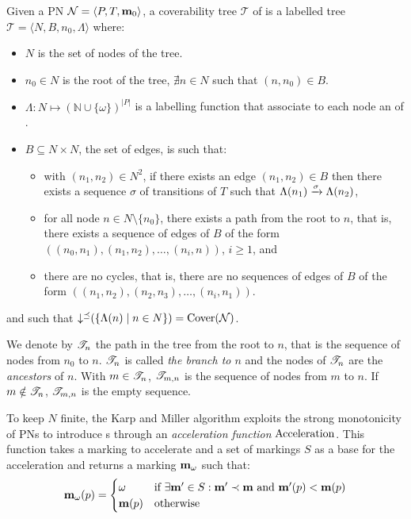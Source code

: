 \begin{defi}
  Given a \ac{PN} $\mathcal{N} = \langle P,T, \mathbf{m}_0\rangle$, a coverability tree $\mathcal{T}$ of \N is a labelled tree $\mathcal{T} = \langle N, B, n_0, \Lambda\rangle$ where:
  \begin{itemize}
    \item $N$ is the set of nodes of the tree.%
    \item $n_0 \in N$ is the root of the tree,  $\nexists n \in N$ such that $(n, n_0) \in B$.
    \item $\Lambda : N \mapsto (\mathbb{N} \cup \{\omega\})^{|P|}$ is a labelling function that associate to each node an \omark of \N.
    \item $B \subseteq N \times N$, the set of edges, is such that:
      \begin{itemize}
        \item with $(n_1, n_2) \in N^2$, if there exists an edge $(n_1, n_2) \in B$ then there exists a sequence $\sigma$ of transitions of $T$ such that $\Lambda(n_1) \xrightarrow{\sigma} \Lambda(n_2)$,
        \item for all node $n \in N \setminus \{n_0\}$, there exists a path from the root to $n$, that is, there exists a sequence of edges of $B$ of the form $((n_0, n_1), (n_1, n_2), \dots, (n_{i}, n))$, $i \geq 1$, and
        \item there are no cycles, that is, there are no sequences of edges of $B$ of the form $((n_1, n_2), (n_2, n_3), \dots, (n_i, n_1))$.
      \end{itemize}
  \end{itemize}
  and such that $\operatorname{\downarrow^\preceq}(\{\Lambda(n) \mid n \in N\}) = \operatorname{Cover}(\mathcal{N})$.
\end{defi}

We denote by $\mathscr{T}_{n}$ the path in the tree from the root to $n$, that is the sequence of nodes from $n_0$ to $n$.
$\mathscr{T}_{n}$ is called \emph{the branch to $n$} and the nodes of $\mathscr{T}_{n}$ are the \emph{ancestors} of $n$.
With $m \in \mathscr{T}_{n}$, $\mathscr{T}_{m,n}$ is the sequence of nodes from $m$ to $n$.
If $m \notin \mathscr{T}_{n}$, $\mathscr{T}_{m,n}$ is the empty sequence.

To keep $N$ finite, the Karp and Miller algorithm exploits the strong monotonicity of \acp{PN} to introduce \omark{}s through an \emph{acceleration function} $\operatorname{Acceleration}$.
This function takes a marking \mar to accelerate and a set of markings $S$ as a base for the acceleration and returns a marking $\mathbf{m}_\omega$ such that:
\[
  \mathbf{m}_\omega(p) =
  \begin{cases}
    \omega    &\text{if } \exists \mathbf{m'} \in S : \mathbf{m'} \prec \mathbf{m} \text{ and } \mathbf{m'}(p) < \mathbf{m}(p) \\
    \mathbf{m}(p)  &\text{otherwise}
  \end{cases}
\]

